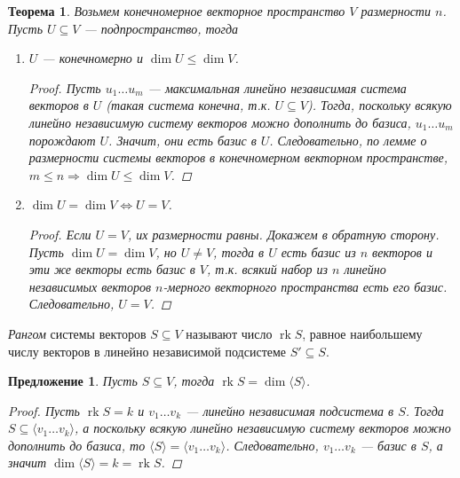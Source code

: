 \documentclass[a4paper, 12pt]{article}
\DeclareMathOperator{\rk}{rk}
\newtheorem*{proposal}{Предложение}
\newtheorem*{theorem46}{Теорема}
\begin{document}
\begin{theorem46}
Возьмем конечномерное векторное пространство $V$ размерности $n$. Пусть $U \subseteq V$ --- подпространство, тогда 
    \begin{enumerate}
    \item $U$ --- конечномерно и $\dim U \le \dim V$.
    
\begin{proof}
Пусть $u_1 \ldots u_m$ --- максимальная линейно независимая система векторов в $U$ (такая система конечна, т.к. $U \subseteq V$). Тогда, поскольку всякую линейно независимую систему векторов можно дополнить до базиса, $u_1 \ldots u_m$ порождают $U$. Значит, они есть базис в $U$. Следовательно, по лемме о размерности системы векторов в конечномерном векторном пространстве, $m \leqslant n \Rightarrow \dim U \leqslant \dim V$.  
\end{proof}
    
    \item $\dim U = \dim V \iff U=V$.
    
\begin{proof}
Если $U=V$, их размерности равны. Докажем в обратную сторону. Пусть $\dim U=\dim V$, но $U\ne V$, тогда в $U$ есть базис из $n$ векторов и эти же векторы есть базис в $V$, т.к. всякий набор из $n$ линейно независимых векторов $n$-мерного векторного пространства есть его базис. Следовательно, $U=V$.
\end{proof}

    \end{enumerate}
\end{theorem46}



\textit{Рангом} системы векторов $S \subseteq V$ называют число $\rk S$, равное наибольшему числу векторов в линейно независимой подсистеме $S' \subseteq S$.

\begin{proposal}
Пусть $S \subseteq V$, тогда $\rk S=\dim\langle S\rangle$.
    
    \begin{proof}
    Пусть $\rk S=k$ и $v_1 \ldots v_k$ --- линейно независимая подсистема в $S$. Тогда $S \subseteq \langle v_1 \ldots  v_k\rangle$, а поскольку всякую линейно независимую систему векторов можно дополнить до базиса, то $\langle S \rangle = \langle v_1 \ldots  v_k\rangle$. Следовательно, $v_1 \ldots v_k$ --- базис в $S$, а значит $\dim\langle S\rangle=k=\rk S$. 
    \end{proof}

\end{proposal}
\end{document}
